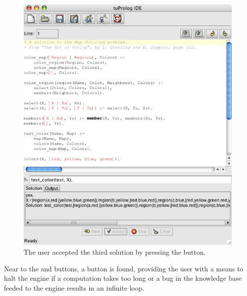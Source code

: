 \begin{figure}
\centering
\includegraphics[scale=0.605]{images/acceptSolution}
\caption{The user accepted the third solution by pressing the  button.}
\label{accept-solution}
\end{figure}

Near to the  and  buttons, a  button is found, providing the user with a means to halt the engine if a computation takes too long or a bug in the knowledge base feeded to the engine results in an infinite loop.


